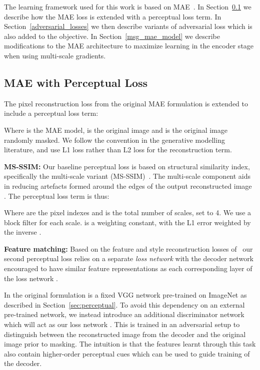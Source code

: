 \documentclass[10pt,twocolumn,letterpaper, cta-author]{article}
\begin{document}
The learning framework used for this work is based on MAE~\cite{MaskedAutoencoders2021}. In Section~\ref{perceptual_loss} we describe how the MAE loss is extended with a perceptual loss term. In Section~\ref{adversarial_losses} we then describe variants of adversarial loss which is also added to the objective. In Section~\ref{msg_mae_model} we describe modifications to the MAE architecture to maximize learning in the encoder stage when using multi-scale gradients.

\subsection{MAE with Perceptual Loss}
\label{perceptual_loss}
The pixel reconstruction loss from the original MAE formulation is extended to include a perceptual loss term:



Where  is the MAE model,  is the original image and  is the original image randomly masked. We follow the convention in the generative modelling literature, and use L1 loss rather than L2 loss for the reconstruction term.

\textbf{MS-SSIM:} Our baseline perceptual loss is based on structural similarity index, specifically the multi-scale variant (MS-SSIM)~\cite{1292216}. The multi-scale component aids in reducing artefacts formed around the edges of the output reconstructed image . The perceptual loss term is thus:



Where  are the pixel indexes and  is the total number of scales, set to 4. We use a  block filter for each scale.  is a weighting constant, with the L1 error weighted by the inverse .

\textbf{Feature matching:} Based on the feature and style reconstruction losses of~\cite{Johnson2016Perceptual} our second perceptual loss relies on a separate \textit{loss network} with the decoder network encouraged to have similar feature representations as each corresponding layer of the loss network .

In the original formulation  is a fixed VGG network pre-trained on ImageNet as described in Section~\ref{sec:perceptual}. To avoid this dependency on an external pre-trained network, we instead introduce an additional discriminator network  which will act as our loss network . This is trained in an adversarial setup to distinguish between the reconstructed image from the decoder  and the original image prior to masking. The intuition is that the features learnt through this task also contain higher-order perceptual cues which can be used to guide training of the decoder.
\end{document}
